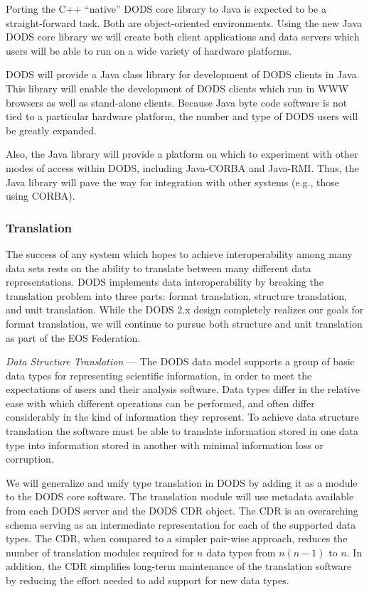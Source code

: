 \documentclass[12pt]{article}
\begin{document}
Porting the C++ ``native'' \ac{DODS} core library to Java is 
expected to be a straight-forward task. Both are object-oriented 
environments. Using the new Java \ac{DODS} core library we will 
create both client 
applications and data servers which users will be able to run on 
a wide variety of hardware platforms. 

\ac{DODS} will provide a Java class library for development of 
\ac{DODS} clients in Java. This library will enable the development 
of \ac{DODS} clients which run in \ac{WWW} browsers as well as 
stand-alone clients. Because Java byte code software is not tied to 
a particular hardware platform, the number and type of \ac{DODS} 
users will be greatly expanded.

Also, the Java library will provide a platform on which to experiment 
with other modes of access within \ac{DODS}, including  Java-\acs{CORBA}
and Java-RMI. Thus, the Java library will pave the way for 
integration with other systems (e.g., those using \ac{CORBA}).

\subsubsection{Translation}\label{translation}

The success of any system which hopes to achieve interoperability 
among many data sets rests on the ability to translate between many 
different data representations. \ac{DODS} implements data 
interoperability by breaking the translation problem into three parts: 
format translation, structure translation, and unit translation. While 
the \ac{DODS} 2.x design completely realizes our goals for format 
translation, we will continue to pursue both structure and unit 
translation as part of the \acs{EOS} Federation.

{\it Data Structure Translation} --- 
The \ac{DODS} data model supports a group of basic data types for
representing scientific information, in order to meet the 
expectations of users and their analysis software. Data types
differ in the relative ease with which different operations can 
be performed, and often differ considerably in the kind of information
they represent. To achieve data structure translation the software
must be able to translate information stored in one data type
into information stored in another with minimal information loss or
corruption.

We will generalize and unify type translation in \ac{DODS} by adding 
it as a module to the \ac{DODS} core software. The translation module 
will use metadata available from each \ac{DODS} server and the 
\ac{DODS} \ac{CDR} object. The \ac{CDR} is an overarching schema 
serving as an intermediate representation for each of the 
supported data types. The \ac{CDR}, when compared to a simpler 
pair-wise approach, reduces the number of translation modules 
required for $n$ data types from $n(n-1)$ to $n$. In addition, the 
\ac{CDR} simplifies long-term maintenance of the translation software 
by reducing the effort needed to add support for new data types.
\end{document}
